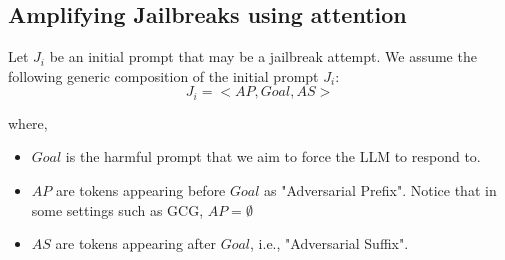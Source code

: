 



\subsection{Amplifying Jailbreaks using attention}

Let $J_i$ be an initial prompt that may be a jailbreak attempt. We assume the following generic composition of the initial prompt $J_i$: 
\begin{equation}
J_i = <AP, Goal , AS>  
\end{equation}

where, 
\begin{itemize}
\setlength{\itemsep}{0in}
    \item $Goal$ is the harmful prompt that we aim to force the LLM to respond to. 
    \item $AP$ are tokens appearing before $Goal$ as "Adversarial Prefix". Notice that in some settings such as GCG, $AP= \emptyset$
    \item $AS$ are tokens appearing after $Goal$, i.e., "Adversarial Suffix". 
\end{itemize}



